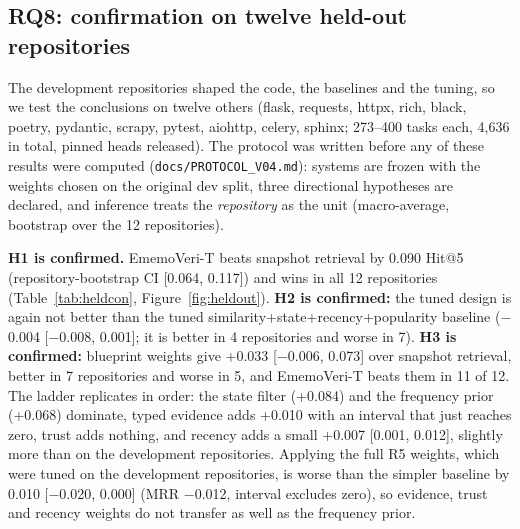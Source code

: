 \documentclass[runningheads]{llncs}
\newcommand{\sys}{EmemoVeri}
\begin{document}
\begin{table}[t]\centering\footnotesize\setlength{\tabcolsep}{3pt}
\resizebox{\linewidth}{!}{}
\caption{Lifecycle events. Query: latest subject touching the file; top-5 membership of the old or new path before and after the event.}
\label{tab:life}
\end{table}

\subsection{RQ8: confirmation on twelve held-out repositories}
\label{sec:heldout}
The development repositories shaped the code, the baselines and the tuning, so we test the conclusions on twelve others (flask, requests, httpx, rich, black, poetry, pydantic, scrapy, pytest, aiohttp, celery, sphinx; 273--400 tasks each, 4{,}636 in total, pinned heads released). The protocol was written before any of these results were computed (\texttt{docs/PROTOCOL\_V04.md}): systems are frozen with the weights chosen on the original dev split, three directional hypotheses are declared, and inference treats the \emph{repository} as the unit (macro-average, bootstrap over the 12 repositories).

\begin{table}[t]\centering\footnotesize\setlength{\tabcolsep}{3pt}
\resizebox{\linewidth}{!}{}
\caption{Frozen systems on the twelve held-out repositories (macro-average over repositories; Dead@5 pooled).}
\label{tab:heldsys}
\end{table}

\begin{table}[t]\centering\footnotesize\setlength{\tabcolsep}{3pt}
\resizebox{\linewidth}{!}{}
\caption{Pre-declared contrasts (H1--H3) and ladder steps over the 12 held-out repositories; CIs from bootstrap over repositories (last column: over tasks). W/L: repositories where the first system is better / worse.}
\label{tab:heldcon}
\end{table}

\textbf{H1 is confirmed.} \sys{}-T beats snapshot retrieval by 0.090 Hit@5 (repository-bootstrap CI [0.064, 0.117]) and wins in all 12 repositories (Table~\ref{tab:heldcon}, Figure~\ref{fig:heldout}). \textbf{H2 is confirmed:} the tuned design is again not better than the tuned similarity+state+recency+popularity baseline ($-$0.004 [$-$0.008, 0.001]; it is better in 4 repositories and worse in 7). \textbf{H3 is confirmed:} blueprint weights give +0.033 [$-$0.006, 0.073] over snapshot retrieval, better in 7 repositories and worse in 5, and \sys{}-T beats them in 11 of 12. The ladder replicates in order: the state filter (+0.084) and the frequency prior (+0.068) dominate, typed evidence adds +0.010 with an interval that just reaches zero, trust adds nothing, and recency adds a small +0.007 [0.001, 0.012], slightly more than on the development repositories. Applying the full R5 weights, which were tuned on the development repositories, is worse than the simpler baseline by 0.010 [$-$0.020, 0.000] (MRR $-$0.012, interval excludes zero), so evidence, trust and recency weights do not transfer as well as the frequency prior.
\end{document}

